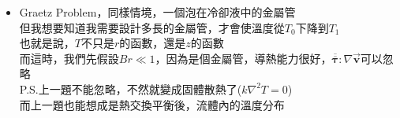 \documentclass[../main.tex]{subfiles}
\begin{document}
\begin{itemize}
\begin{enumerate}
\begin{equation}
    \end{equation}
    \item 再次積分:
    \begin{align}
      T(x) &= -\frac{4\mu U_{\text{max}}^2}{k B^4} \cdot \frac{x^4}{12} + C_2 \nonumber\\
      &= -\frac{\mu U_{\text{max}}^2}{3 k B^4} x^4 + C_2
    \end{align}
    \item 代入(\ref{eq:simple_graetz_bc1})求$C_2$:
    \begin{equation}
      T_0 = -\frac{\mu U_{\text{max}}^2}{3 k B^4} B^4 + C_2 \Rightarrow C_2 = T_0 + \frac{\mu U_{\text{max}}^2}{3 k} 
    \end{equation}
    \item 最後解為:
    \begin{equation}
      \boxed{T(x) = T_0 + \frac{\mu U_{\text{max}}^2}{3 k} \left(
        1 - \frac{x^4}{B^4}
      \right)}
    \end{equation}
    \item 可看出溫度最大值發生在$x=0$
    \begin{equation}
      T_{\text{max}} = T(x=0) = T_0 + \frac{\mu U_{\text{max}}^2}{3 k}
    \end{equation}
    \item 而將$T_0$移到等號左邊，變成$\Delta T$，然後再同除$\Delta T$，就會出現無因次群
    \begin{equation}
      \Delta T = \frac{\mu U_{\text{max}}^2}{3 k} \implies \frac{\mu U_{\text{max}}^2}{k \Delta T} = 3
    \end{equation}
    Brinkman number:
    \begin{equation}
      \boxed{\text{Br} = \frac{\mu U_{\text{max}}^2}{k \Delta T} = \frac{\text{黏性耗散產生的熱量}}{\text{導熱能力}}}
    \end{equation}
  \end{enumerate}
  \item Graetz Problem，同樣情境，一個泡在冷卻液中的金屬管\\
  但我想要知道我需要設計多長的金屬管，才會使溫度從$T_0$下降到$T_1$\\
  也就是說，$T$不只是$r$的函數，還是$z$的函數\\
  而這時，我們先假設$Br\ll 1$，因為是個金屬管，導熱能力很好，$\overline{\overline{\bm \tau}}:\nabla \vec{\bm v}$可以忽略\\
  P.S.上一題不能忽略，不然就變成固體散熱了($k\nabla^2T = 0$)\\
  而上一題也能想成是熱交換平衡後，流體內的溫度分布

\end{itemize}
\end{document}
